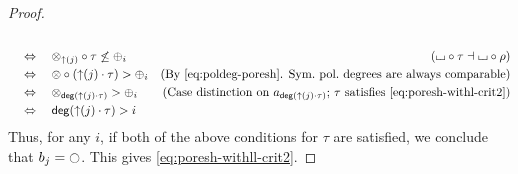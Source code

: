 \documentclass[a4paper]{memoir}
\begin{document}
\begin{proof}
\begin{align*}
		\\ &\quad\Leftrightarrow\quad
		\mixpol_{\sucdeg(j)} \circ \tau \not\leq \pospol_i
		& \text{($\loch \circ \tau \dashv \loch \circ \rho$)}
		\\ &\quad\Leftrightarrow\quad
		\mixpol \circ ({\sucdeg(j)} \cdot \tau) > \pospol_i
		& \text{(By \cref{eq:poldeg-poresh}. Sym.\ pol.\ degrees are always comparable)}
		\\ &\quad\Leftrightarrow\quad
		\mixpol_{\getdeg({\sucdeg(j)} \cdot \tau)} > \pospol_i
		& \text{(Case distinction on $a_{\getdeg({\sucdeg(j)} \cdot \tau)}$; $\tau$ satisfies \cref{eq:poresh-withl-crit2})}
		\\ &\quad\Leftrightarrow\quad
		\getdeg({\sucdeg(j)} \cdot \tau) > i
	\end{align*}
	Thus, for any $i$, if both of the above conditions for $\tau$ are satisfied, we conclude that $b_j = \npolar$.
	This gives \cref{eq:poresh-withll-crit2}.
\end{proof}
\end{document}
